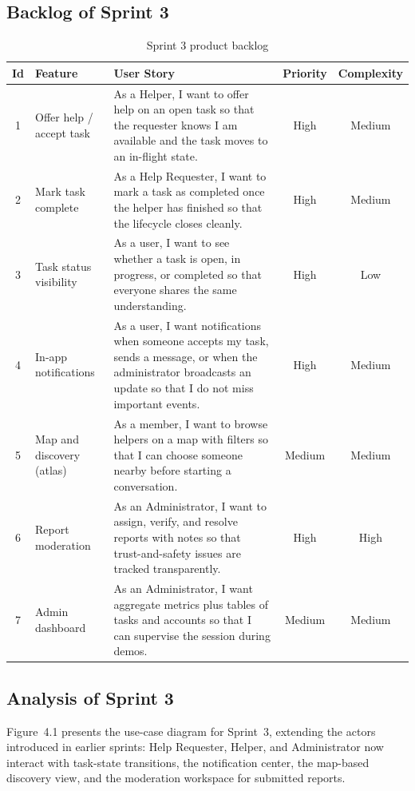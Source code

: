 \documentclass[11pt,a4paper]{article}
\begin{document}
\subsection{Backlog of Sprint 3}
\begin{table}[h]
	\centering
	\begin{tabular}{|c|l|p{6.8cm}|c|c|}
		\hline
		\textbf{Id} & \textbf{Feature} & \textbf{User Story} & \textbf{Priority} & \textbf{Complexity} \\
		\hline
		1 & Offer help / accept task & As a Helper, I want to offer help on an open task so that the requester knows I am available and the task moves to an in-flight state. & High & Medium \\
		\hline
		2 & Mark task complete & As a Help Requester, I want to mark a task as completed once the helper has finished so that the lifecycle closes cleanly. & High & Medium \\
		\hline
		3 & Task status visibility & As a user, I want to see whether a task is open, in progress, or completed so that everyone shares the same understanding. & High & Low \\
		\hline
		4 & In-app notifications & As a user, I want notifications when someone accepts my task, sends a message, or when the administrator broadcasts an update so that I do not miss important events. & High & Medium \\
		\hline
		5 & Map and discovery (atlas) & As a member, I want to browse helpers on a map with filters so that I can choose someone nearby before starting a conversation. & Medium & Medium \\
		\hline
		6 & Report moderation & As an Administrator, I want to assign, verify, and resolve reports with notes so that trust-and-safety issues are tracked transparently. & High & High \\
		\hline
		7 & Admin dashboard & As an Administrator, I want aggregate metrics plus tables of tasks and accounts so that I can supervise the session during demos. & Medium & Medium \\
		\hline
	\end{tabular}
	\caption{Sprint 3 product backlog}
\end{table}

\subsection{Analysis of Sprint 3}
Figure~4.1 presents the use-case diagram for Sprint~3, extending the actors introduced in earlier sprints: Help Requester, Helper, and Administrator now interact with task-state transitions, the notification center, the map-based discovery view, and the moderation workspace for submitted reports.
\end{document}
